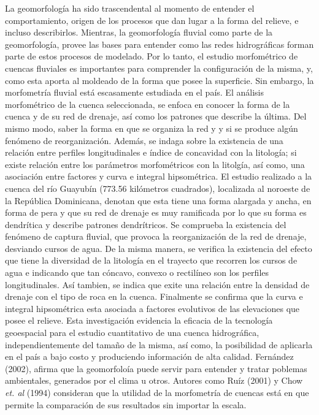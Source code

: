 \documentclass[11pt,]{article}
\renewenvironment{abstract}
 {{%
    \setlength{\leftmargin}{0mm}
    \setlength{\rightmargin}{\leftmargin}%
  }%
  \relax}
 {\endlist}
\begin{document}
\begin{abstract}

    \hbox{\vrule height .2pt width 39.14pc}

    \vskip 8.5pt %

\noindent La geomorfología ha sido trascendental al momento de entender el
comportamiento, origen de los procesos que dan lugar a la forma del
relieve, e incluso describirlos. Mientras, la geomorfología fluvial como
parte de la geomorfología, provee las bases para entender como las redes
hidrográficas forman parte de estos procesos de modelado. Por lo tanto,
el estudio morfométrico de cuencas fluviales es importantes para
comprender la configuración de la misma, y, como esta aporta al moldeado
de la forma que posee la superficie. Sin embargo, la morfometría fluvial
está escasamente estudiada en el país. El análisis morfométrico de la
cuenca seleccionada, se enfoca en conocer la forma de la cuenca y de su
red de drenaje, así como los patrones que describe la última. Del mismo
modo, saber la forma en que se organiza la red y y si se produce algún
fenómeno de reorganización. Además, se indaga sobre la existencia de una
relación entre perfiles longitudinales e índice de concavidad con la
litología; si existe relación entre los parámetros morfométricos con la
litolgía, así como, una asociación entre factores y curva e integral
hipsométrica. El estudio realizado a la cuenca del río Guayubín (773.56
kilómetros cuadrados), localizada al noroeste de la República
Dominicana, denotan que esta tiene una forma alargada y ancha, en forma
de pera y que su red de drenaje es muy ramificada por lo que su forma es
dendrítica y describe patrones dendrítricos. Se comprueba la existencia
del fenómeno de captura fluvial, que provoca la reorganización de la red
de drenaje, desviando cursos de agua. De la misma manera, se verifica la
existencia del efecto que tiene la diversidad de la litología en el
trayecto que recorren los cursos de agua e indicando que tan cóncavo,
convexo o rectilíneo son los perfiles longitudinales. Así tambien, se
indica que exite una relación entre la densidad de drenaje con el tipo
de roca en la cuenca. Finalmente se confirma que la curva e integral
hipsométrica esta asociada a factores evolutivos de las elevaciones que
posee el relieve. Esta investigación evidencia la eficacia de la
tecnología geoespacial para el estudio cuantitativo de una cuenca
hidrográfica, independientemente del tamaño de la misma, así como, la
posibilidad de aplicarla en el país a bajo costo y produciendo
información de alta calidad. Fernández (2002), afirma que la
geomorfoloía puede servir para entender y tratar poblemas ambientales,
generados por el clima u otros. Autores como Ruíz (2001) y Chow
\emph{et. al} (1994) consideran que la utilidad de la morfometría de
cuencas está en que permite la comparación de sus resultados sin
importar la escala.



\end{abstract}
\end{document}
